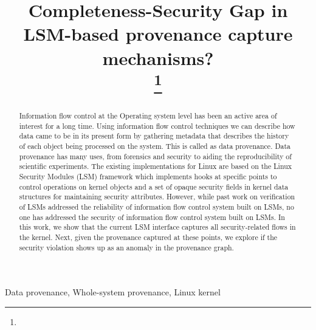 \documentclass{IEEEtran}
\begin{document}
\title{Completeness-Security Gap in LSM-based provenance capture mechanisms?\\
{\footnotesize}
\thanks{}
}

\author{


}

\maketitle
\large
\begin{abstract}
Information flow control at the Operating system level has been an active area of interest for a long time. Using information flow control techniques we can describe how data came to be in its present form by gathering metadata that describes the history of each object being processed on the system. This is called as data provenance. Data provenance has many uses, from forensics and security to aiding the reproducibility of scientific experiments. The existing implementations for Linux are based on the Linux Security Modules (LSM) framework which implements hooks at specific points to control operations on kernel objects and a set of opaque security fields in kernel data structures for maintaining security attributes. 
However, while past work on verification of LSMs addressed the reliability of information flow control system built on LSMs, no one has addressed the security of information flow control system built on LSMs. In this work, we show that the current LSM interface captures all security-related flows in the kernel. Next, given the provenance captured at these points, we explore if the security violation shows up as an anomaly in the provenance graph. 
\end{abstract}



\begin{IEEEkeywords}
	Data provenance, Whole-system provenance, Linux kernel
\end{IEEEkeywords}
\end{document}
